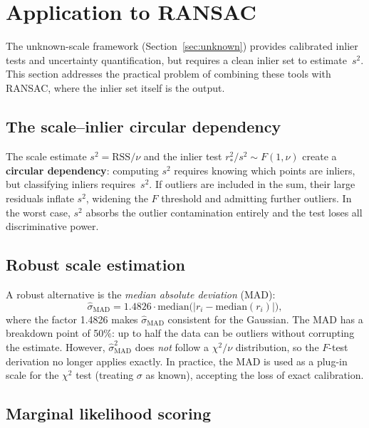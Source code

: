 \documentclass[11pt]{article}
\begin{document}
\section{Application to RANSAC}
\label{sec:ransac}

The unknown-scale framework (Section~\ref{sec:unknown}) provides
calibrated inlier tests and uncertainty quantification, but requires a
clean inlier set to estimate~$s^2$.  This section addresses the
practical problem of combining these tools with RANSAC, where the
inlier set itself is the output.

\subsection{The scale--inlier circular dependency}
\label{sec:outlier-scale}

The scale estimate $s^2 = \mathrm{RSS}/\nu$ and the inlier test
$r_*^2/s^2 \sim F(1,\nu)$ create a \textbf{circular dependency}: computing
$s^2$ requires knowing which points are inliers, but classifying inliers
requires~$s^2$.  If outliers are included in the sum, their large residuals
inflate $s^2$, widening the $F$ threshold and admitting further outliers.
In the worst case, $s^2$ absorbs the outlier contamination entirely and the
test loses all discriminative power.

\subsection{Robust scale estimation}

A robust alternative is the \emph{median absolute deviation} (MAD):
\begin{equation}
  \hat\sigma_{\mathrm{MAD}}
    = 1.4826 \cdot \mathrm{median}\!\bigl(|r_i - \mathrm{median}(r_i)|\bigr),
\end{equation}
where the factor 1.4826 makes $\hat\sigma_{\mathrm{MAD}}$ consistent for
the Gaussian.  The MAD has a breakdown point of 50\%: up to half the data
can be outliers without corrupting the estimate.  However,
$\hat\sigma_{\mathrm{MAD}}^2$ does \emph{not} follow a $\chi^2/\nu$
distribution, so the $F$-test derivation no longer applies exactly.  In
practice, the MAD is used as a plug-in scale for the $\chi^2$ test
(treating $\sigma$ as known), accepting the loss of exact calibration.

\subsection{Marginal likelihood scoring}
\label{sec:marginal-likelihood}
\end{document}
